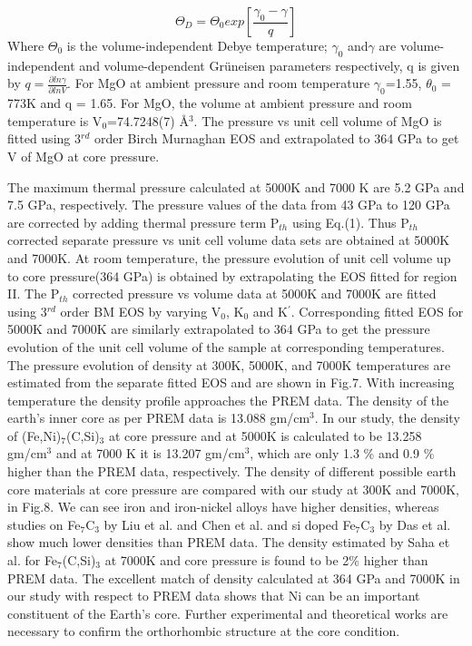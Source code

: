 \documentclass[prb,aps,preprint]{revtex4-2}
\begin{document}
\begin{equation}	
	\Theta_{D} =\Theta _{0}exp\left [ \frac{\gamma _{0}-\gamma }{q} \right ]
\end{equation}
Where $\Theta_{0}$ is the volume-independent Debye temperature; $\gamma_{0}$ and$\gamma$ are volume-independent and volume-dependent Grüneisen parameters respectively, q is given by $q=\frac{\partial ln\gamma }{\partial lnV}$.
For MgO at ambient pressure and room temperature $\gamma _{0}$=1.55, $\theta_{0}$ = 773K and  q = 1.65\cite{speziale2001quasi}. For MgO, the volume at ambient pressure and room temperature is V$_{0}$=74.7248(7) \AA$^{3}$. The pressure vs unit cell volume of MgO is fitted using 3$^{rd}$ order Birch Murnaghan EOS and extrapolated to 364 GPa to get V of MgO at core pressure.

The maximum thermal pressure calculated at 5000K and 7000 K are 5.2 GPa and 7.5 GPa, respectively. The pressure values of the data from 43 GPa to 120 GPa are corrected by adding thermal pressure term P$_{th}$ using Eq.(1). Thus P$_{th}$ corrected separate pressure vs unit cell volume data sets are obtained at 5000K and 7000K. At room temperature, the pressure evolution of unit cell volume up to core pressure(364 GPa) is obtained by extrapolating the EOS fitted for region II. The P$_{th}$ corrected pressure vs volume data at 5000K and 7000K are fitted using 3$^{rd}$ order BM EOS by varying V$_{0}$, K$_{0}$ and K$^{'}$. Corresponding fitted EOS for 5000K and 7000K are similarly extrapolated to 364 GPa to get the pressure evolution of the unit cell volume of the sample at corresponding temperatures. 
The pressure evolution of density at 300K, 5000K, and 7000K temperatures are estimated from the separate fitted EOS and are shown in Fig.7. With increasing temperature the density profile approaches the PREM data.
The density of the earth's inner core as per PREM data is 13.088 gm/cm$^{3}$. In our study, the density of (Fe,Ni)$_{7}$(C,Si)$_{3}$ at core pressure and at 5000K is calculated to be 13.258 gm/cm$^{3}$  and at 7000 K it is 13.207 gm/cm$^{3}$, which are only 1.3 \% and 0.9 \% higher than the PREM data, respectively. The density of different possible earth core materials at core pressure are compared with our study at 300K and 7000K, in Fig.8. We can see iron\cite{dubrovinsky2000situ} and iron-nickel alloys\cite{hirao2022equations} have higher densities, whereas studies on Fe$_{7}$C$_{3}$ by Liu et al.\cite{liu2016phase} and Chen et al.\cite{chen2012magneto} and si doped Fe$_{7}$C$_{3}$ by Das et al.\cite{das2017first} show much lower densities than PREM data. The density estimated by Saha et al. for Fe$_{7}$(C,Si)$_{3}$ at 7000K and core pressure is found to be 2\% higher than PREM data. 
The excellent match of density calculated at 364 GPa and 7000K in our study with respect to PREM data shows that Ni can be an important constituent of the Earth's core. Further experimental and theoretical works are necessary to confirm the orthorhombic structure at the core condition.
\newpage
\end{document}
